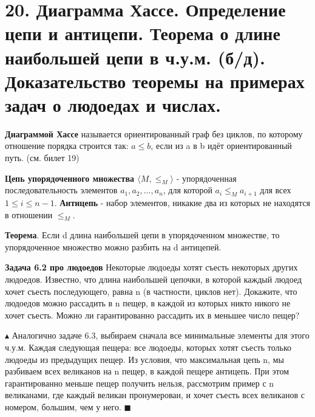 \section*{20. Диаграмма Хассе. Определение цепи и антицепи. Теорема о длине наибольшей цепи в ч.у.м. (б/д). Доказательство теоремы на примерах задач о людоедах и числах.}
\textbf{Диаграммой Хассе} называется ориентированный граф без циклов, по которому отношение порядка строится так: $a \leqslant b$, если из a в b идёт ориентированный путь. (см. билет 19) \\ \par

\textbf{Цепь упорядоченного множества $\langle M, \leqslant_M \rangle$} - упорядоченная последовательность элементов $a_1, a_2, \dots, a_n$, для которой $a_i \leqslant_M a_{i+1} $ для всех $1 \leqslant i \leqslant n-1$. \textbf{Антицепь} - набор элементов, никакие два из которых не находятся в отношении $\leqslant_M$. \\ \par
\textbf{Теорема}. Если d длина наибольшей цепи в упорядоченном множестве, то упорядоченное множество можно разбить на d антицепей. \par
\textbf{Задача 6.2 про людоедов} Некоторые людоеды хотят съесть некоторых других людоедов. Известно, что длина наибольшей
цепочки, в которой каждый людоед хочет съесть последующего, равна n (в частности, циклов нет). Докажите, что людоедов можно рассадить в n пещер, в каждой из которых никто никого не хочет съесть. Можно ли гарантированно рассадить их в меньшее число пещер? \par
$\blacktriangle$
Аналогично задаче 6.3, выбираем сначала все минимальные элементы для этого ч.у.м. Каждая следующая пещера: все людоеды, которых хотят съесть только людоеды из предыдущих пещер. Из условия, что максимальная цепь n, мы разбиваем всех великанов на n пещер, в каждой пещере антицепь. При этом гарантированно меньше пещер получить нельзя, рассмотрим пример с n великанами, где каждый великан пронумерован, и хочет съесть всех великанов с номером, большим, чем у него.
$\blacksquare$ \\ \par

